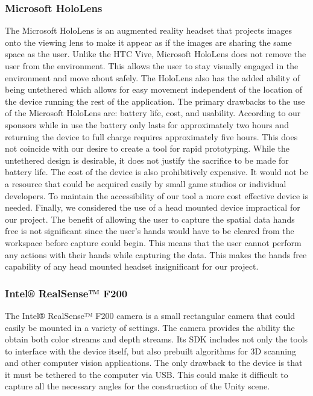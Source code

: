 \documentclass[12pt]{article}
\begin{document}
\subsubsection{Microsoft HoloLens}\label{microsoft-hololens}

The Microsoft HoloLens is an augmented reality headset that projects
images onto the viewing lens to make it appear as if the images are
sharing the same space as the user. Unlike the HTC Vive, Microsoft
HoloLens does not remove the user from the environment. This allows the
user to stay visually engaged in the environment and move about safely.
The HoloLens also has the added ability of being untethered which allows
for easy movement independent of the location of the device running the
rest of the application. The primary drawbacks to the use of the
Microsoft HoloLens are: battery life, cost, and usability. According to
our sponsors while in use the battery only lasts for approximately two
hours and returning the device to full charge requires approximately
five hours. This does not coincide with our desire to create a tool for
rapid prototyping. While the untethered design is desirable, it does not
justify the sacrifice to be made for battery life. The cost of the
device is also prohibitively expensive. It would not be a resource that
could be acquired easily by small game studios or individual developers.
To maintain the accessibility of our tool a more cost effective device
is needed. Finally, we considered the use of a head mounted device
impractical for our project. The benefit of allowing the user to capture
the spatial data hands free is not significant since the user's hands
would have to be cleared from the workspace before capture could begin.
This means that the user cannot perform any actions with their hands
while capturing the data. This makes the hands free capability of any
head mounted headset insignificant for our project.

\subsubsection{Intel® RealSense™ F200}\label{intel-realsense-f200}

The Intel® RealSense™ F200 camera is a small rectangular camera that
could easily be mounted in a variety of settings. The camera provides
the ability the obtain both color streams and depth streams. Its SDK
includes not only the tools to interface with the device itself, but
also prebuilt algorithms for 3D scanning and other computer vision
applications. The only drawback to the device is that it must be
tethered to the computer via USB. This could make it difficult to
capture all the necessary angles for the construction of the Unity
scene.
\end{document}
